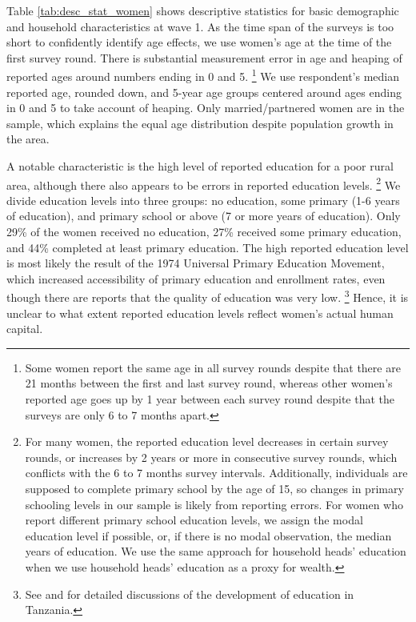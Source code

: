 \documentclass[letterpaper,12pt]{article}
\begin{document}



Table \ref{tab:desc_stat_women} shows descriptive statistics for basic
demographic and household characteristics at wave 1.
As the time span of the surveys is too short to confidently identify age effects,
we use women's age at the time of the first survey round.
There is substantial measurement error in age and heaping of reported ages 
around numbers ending in 0 and 5.%
\footnote{
Some women report the same age in all survey rounds despite that there are
21 months between the first and last survey round, whereas other women's reported 
age goes up by 1 year between each survey round despite that the surveys are only 
6 to 7 months apart.
}
We use respondent's median reported age, rounded down, and 5-year age groups 
centered around ages ending in 0 and 5 to take account of heaping.
Only married/partnered women are in the sample, which explains the 
equal age distribution despite population growth in the area.

A notable characteristic is the high level of reported education for a poor 
rural area, although there also appears to be errors in 
reported education levels.%
\footnote{
For many women, the reported education level decreases in certain survey 
rounds, or increases by 2 years or more in consecutive survey rounds, which 
conflicts with the 6 to 7 months survey intervals. 
Additionally, individuals are supposed to complete primary school by the age of 15,
so changes in primary schooling levels in our sample is likely from reporting 
errors. 
For women who report different primary school education levels, we 
assign the modal education level if possible, or, if there is no modal 
observation, the median years of education.
We use the same approach for household heads' education
when we use household heads' education as a proxy for wealth.
}
We divide education levels into three groups: no education, 
some primary (1-6 years of education), and primary school 
or above (7 or more years of education).
Only 29\% of the women received no education, 27\% received some 
primary education, and 44\% completed at least primary education.
The high reported education level is most likely the result of the 1974 
Universal Primary Education Movement,
which increased accessibility of primary education and enrollment rates, 
even though there are reports that the quality of education was very low.%
\footnote{
See \cite{Galabawa2001} and \cite{Wedgwood2005} for detailed discussions 
of the development of education in Tanzania.
}
Hence, it is unclear to what extent reported education levels reflect 
women's actual human capital.
\end{document}
